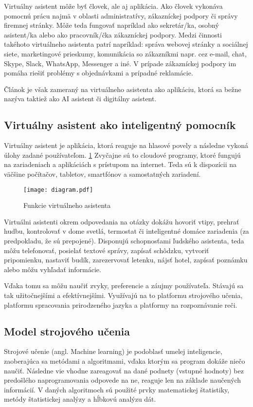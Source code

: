 \documentclass[10pt,twoside,slovak,coursepaper]{article}
\begin{document}
Virtuálny asistent môže byť človek, ale aj aplikácia. Ako človek vykonáva pomocnú prácu najmä v oblasti administratívy, zákazníckej podpory či správy firemnej stránky. Môže teda fungovať napríklad ako sekretár/ka, osobný asistent/ka alebo ako pracovník/čka zákazníckej podpory. Medzi činnosti takéhoto virtuálneho asistenta patrí napríklad: správa webovej stránky a sociálnej siete, marketingové prieskumy, komunikácia so zákazníkmi napr. cez e-mail, chat, Skype, Slack, WhatsApp, Messenger a iné. V prípade zákazníckej podpory im pomáha riešiť problémy s objednávkami a prípadné reklamácie.\cite{Bouhanikova}

Článok je však zameraný na virtuálneho asistenta ako aplikáciu, ktorá sa bežne nazýva taktiež ako AI asistent či digitálny asistent. 

\subsection{Virtuálny asistent ako inteligentný pomocník}
Virtuálny asistent je aplikácia, ktorá reaguje na hlasové povely a následne vykoná úlohy zadané používateľom. \ref{diagram} Zvyčajne sú to cloudové programy, ktoré fungujú na zariadeniach a aplikáciách s prístupom na internet. Teda sú k dispozícii na väčšine počítačov, tabletov, smartfónov a samostatných zariadení.\cite{Gupta}
\begin{figure}[H]
\centering
\texttt{[image: diagram.pdf]}
\caption{Funkcie virtuálneho asistenta \cite{McLaughlin}}
\label{diagram}
\end{figure}

Virtuálni asistenti okrem odpovedania na otázky dokážu hovoriť vtipy, prehrať hudbu, kontrolovať v dome svetlá, termostat či inteligentné domáce zariadenia (za predpokladu, že sú prepojené). Disponujú schopnosťami ľudského asistenta, teda môžu telefonovať, posielať textové správy, zapísať schôdzku, vytvoriť pripomienku, nastaviť budík, zarezervovať letenku, nájsť hotel, zapísať poznámku alebo môžu vyhľadať informácie. \cite{McLaughlin}

Vďaka tomu sa môžu naučiť zvyky, preferencie a záujmy používateľa. Stávajú sa tak užitočnejšími a efektívnejšími. Využívajú na to platformu strojového učenia, platformu spracovania prirodzeného jazyka a platformy na rozpoznávanie reči.\cite{Botelho}

\subsection{Model strojového učenia}
Strojové učenie (angl. Machine learning) je podoblasť umelej inteligencie, zaoberajúca sa metódami a algoritmami, vďaka ktorým sa program dokáže niečo naučiť. Následne vie vhodne zareagovať na dané podnety (vstupné hodnoty) bez predošlého naprogramovania odpovede na ne, reaguje len na základe naučených informácií. V daných algoritmoch sú použité prvky matematickej štatistiky, metódy štatistickej analýzy a hĺbkovú analýzu dát. \cite{Cibula}
\end{document}
